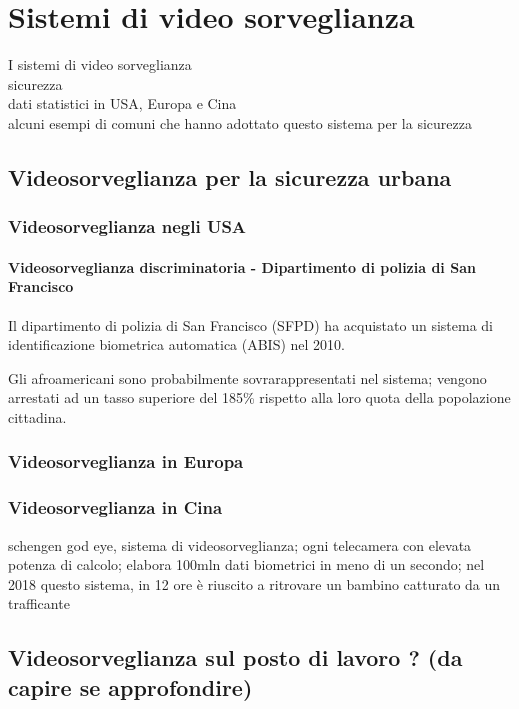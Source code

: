 \chapter{Sistemi di video sorveglianza}
I sistemi di video sorveglianza\\
sicurezza \\
dati statistici in USA, Europa e Cina\\
alcuni esempi di comuni che hanno adottato questo sistema per la sicurezza 

\section{Videosorveglianza per la sicurezza urbana}
\subsection{Videosorveglianza negli USA}
\subsubsection{Videosorveglianza discriminatoria - Dipartimento di polizia di San Francisco}
Il dipartimento di polizia di San Francisco (SFPD) ha acquistato un sistema di identificazione biometrica automatica (ABIS) nel 2010.

Gli afroamericani sono probabilmente sovrarappresentati nel sistema; vengono arrestati ad un tasso superiore del 185\% rispetto alla loro quota della popolazione cittadina.\cite{sfpd_abis}
\subsection{Videosorveglianza in Europa}
\subsection{Videosorveglianza in Cina}
schengen god eye, sistema di videosorveglianza; ogni telecamera con elevata potenza di calcolo; elabora 100mln dati biometrici in meno di un secondo; nel 2018 questo sistema, in 12 ore è riuscito a ritrovare un bambino catturato da un trafficante \cite{cina_shenzen}
\section{Videosorveglianza sul posto di lavoro ? (da capire se approfondire)}

